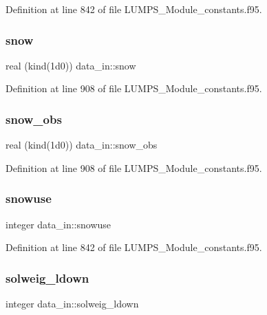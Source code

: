 Definition at line 842 of file L\+U\+M\+P\+S\+\_\+\+Module\+\_\+constants.\+f95.

\mbox{\label{namespacedata__in_a4e7d05b463b07d80dfb5d3d65aea03e2}} 
\subsubsection{\texorpdfstring{snow}{snow}}
{\footnotesize\ttfamily real (kind(1d0)) data\+\_\+in\+::snow}



Definition at line 908 of file L\+U\+M\+P\+S\+\_\+\+Module\+\_\+constants.\+f95.

\mbox{\label{namespacedata__in_ac93d21776972756112d04651ac3cbb22}} 
\subsubsection{\texorpdfstring{snow\+\_\+obs}{snow\_obs}}
{\footnotesize\ttfamily real (kind(1d0)) data\+\_\+in\+::snow\+\_\+obs}



Definition at line 908 of file L\+U\+M\+P\+S\+\_\+\+Module\+\_\+constants.\+f95.

\mbox{\label{namespacedata__in_a43b72c0ea9c40a969cac5f758c240815}} 
\subsubsection{\texorpdfstring{snowuse}{snowuse}}
{\footnotesize\ttfamily integer data\+\_\+in\+::snowuse}



Definition at line 842 of file L\+U\+M\+P\+S\+\_\+\+Module\+\_\+constants.\+f95.

\mbox{\label{namespacedata__in_ad47d3fca8d8d48dabc51d4838153fab9}} 
\subsubsection{\texorpdfstring{solweig\+\_\+ldown}{solweig\_ldown}}
{\footnotesize\ttfamily integer data\+\_\+in\+::solweig\+\_\+ldown}



